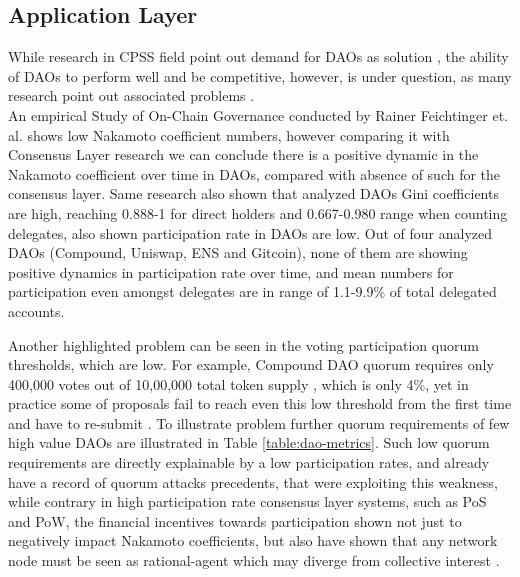 \documentclass{article}
\begin{document}
\begin{CJK}{UTF8}{gbsn}
\begin{multicols}{2}
        \subsection{Application Layer}
        While research in CPSS field point out demand for DAOs as solution \cite{Fei2016}\cite{Wang2022}\cite{Juanjuan2023}, the ability of DAOs to perform well and be competitive, however, is under question, as many research point out associated problems \cite{Rainer2023}\cite{Marcella2016}\cite{Xuan2024}.  \\An empirical Study of On-Chain Governance conducted by Rainer Feichtinger et. al. \cite{Rainer2023} shows low Nakamoto coefficient numbers, however comparing it with Consensus Layer research \cite{Dominic2023} we can conclude there is a positive dynamic in the Nakamoto coefficient over time in DAOs, compared with absence of such for the consensus layer. Same research\cite{Rainer2023} also shown that analyzed DAOs Gini coefficients\cite{Lidia2012} are high, reaching 0.888-1 for direct holders and 0.667-0.980 range when counting delegates, also shown participation rate in DAOs are low. Out of four analyzed DAOs (Compound, Uniswap, ENS and Gitcoin), none of them are showing positive dynamics in participation rate over time, and mean numbers for participation even amongst delegates are in range of 1.1-9.9\% of total delegated accounts.


        Another highlighted problem can be seen in the voting participation quorum thresholds, which are low. For example, Compound DAO quorum requires only 400,000 \cite{CompDAO} votes out of 10,00,000 total token supply \cite{CompToken}, which is only 4\%, yet in practice some of proposals fail to reach even this low threshold from the first time and have to re-submit \cite{CompProp232}\cite{CompProp237}. To illustrate problem further quorum requirements of few high value DAOs are illustrated in Table \ref*{table:dao-metrics}. Such low quorum requirements are directly explainable by a low participation rates, and already have a record of quorum attacks \cite{AragonBlog}\cite{rhizoo2023} precedents, that were exploiting this weakness, while contrary in high participation rate consensus layer systems, such as PoS and PoW, the financial incentives towards participation shown not just to negatively impact  Nakamoto coefficients, but also have shown that any network node must be seen as rational-agent which may diverge from collective interest \cite{Philip2019}.
            

\end{multicols}
\end{CJK}
\end{document}
